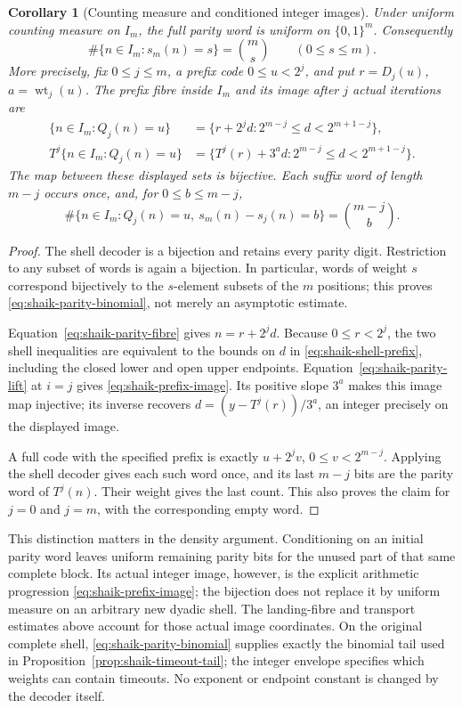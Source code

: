 \documentclass[11pt]{article}
\newtheorem{corollary}[proposition]{Corollary}
\theoremstyle{remark}\newtheorem{remark}[proposition]{Remark}
\begin{document}
\begin{corollary}[Counting measure and conditioned integer images]
\label{cor:shaik-parity-counting}
Under uniform counting measure on \(I_m\), the full parity word is
uniform on \(\{0,1\}^m\). Consequently
\begin{equation}\label{eq:shaik-parity-binomial}
 \#\{n\in I_m:s_m(n)=s\}=\binom ms\qquad(0\le s\le m).
\end{equation}
More precisely, fix \(0\le j\le m\), a prefix code \(0\le u<2^j\),
and put \(r=D_j(u)\), \(a=\operatorname{wt}_j(u)\). The prefix fibre
inside \(I_m\) and its image after \(j\) actual iterations are
\begin{align}
 \{n\in I_m:Q_j(n)=u\}
   &=\{r+2^j d:2^{m-j}\le d<2^{m+1-j}\},\label{eq:shaik-shell-prefix}\\
 T^j\{n\in I_m:Q_j(n)=u\}
   &=\{T^j(r)+3^a d:2^{m-j}\le d<2^{m+1-j}\}.
 \label{eq:shaik-prefix-image}
\end{align}
The map between these displayed sets is bijective. Each suffix word
of length \(m-j\) occurs once, and, for \(0\le b\le m-j\),
\[
 \#\{n\in I_m:Q_j(n)=u,\ s_m(n)-s_j(n)=b\}
       =\binom{m-j}{b}.
\]
\end{corollary}
\begin{proof}
The shell decoder is a bijection and retains every parity digit.
Restriction to any subset of words is again a bijection. In particular,
words of weight \(s\) correspond bijectively to the \(s\)-element
subsets of the \(m\) positions; this proves
\eqref{eq:shaik-parity-binomial}, not merely an asymptotic estimate.

Equation~\eqref{eq:shaik-parity-fibre} gives \(n=r+2^j d\).
Because \(0\le r<2^j\), the two shell inequalities are equivalent to
the bounds on \(d\) in \eqref{eq:shaik-shell-prefix}, including the
closed lower and open upper endpoints. Equation~\eqref{eq:shaik-parity-lift}
at \(i=j\) gives \eqref{eq:shaik-prefix-image}. Its positive slope
\(3^a\) makes this image map injective; its inverse recovers
\(d=(y-T^j(r))/3^a\), an integer precisely on the displayed image.

A full code with the specified prefix is exactly \(u+2^j v\),
\(0\le v<2^{m-j}\). Applying the shell decoder gives each such
word once, and its last \(m-j\) bits are the parity word of \(T^j(n)\).
Their weight gives the last count. This also proves the claim
for \(j=0\) and \(j=m\), with the corresponding empty word.
\end{proof}

This distinction matters in the density argument. Conditioning on an
initial parity word leaves uniform remaining parity bits for the
unused part of that same complete block. Its actual integer image,
however, is the explicit arithmetic progression
\eqref{eq:shaik-prefix-image}; the bijection does not replace it by
uniform measure on an arbitrary new dyadic shell. The landing-fibre
and transport estimates above account for those actual image coordinates.
On the original complete shell,
\eqref{eq:shaik-parity-binomial} supplies exactly the binomial tail
used in Proposition~\ref{prop:shaik-timeout-tail}; the integer envelope
specifies which weights can contain timeouts. No exponent or
endpoint constant is changed by the decoder itself.
\end{document}
